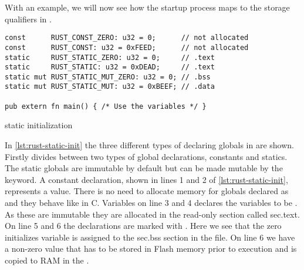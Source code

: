 With an example, we will now see how the startup process maps to the storage qualifiers in {\rust}.
\begin{listing}[H]
\begin{verbatim}
const      RUST_CONST_ZERO: u32 = 0;      // not allocated
const      RUST_CONST: u32 = 0xFEED;      // not allocated
static     RUST_STATIC_ZERO: u32 = 0;     // .text
static     RUST_STATIC: u32 = 0xDEAD;     // .text
static mut RUST_STATIC_MUT_ZERO: u32 = 0; // .bss
static mut RUST_STATIC_MUT: u32 = 0xBEEF; // .data

pub extern fn main() { /* Use the variables */ }
\end{verbatim}
\caption{\rust static initialization}
\label{lst:rust-static-init}
\end{listing}
In \autoref{lst:rust-static-init} the three different types of declaring globals in {\rust} are shown.
Firstly {\rust} divides between two types of global declarations, constants and statics.
The static globals are immutable by default but can be made mutable by the  keyword.
A constant declaration, shown in lines 1 and 2 of \autoref{lst:rust-static-init}, represents a value.
There is no need to allocate memory for globals declared as  and they behave like  in C. 
Variables on line 3 and 4 declares the variables to be .
As these are immutable they are allocated in the read-only section called {\elf}sec{.text}.
On line 5 and 6 the declarations are marked with .
Here we see that the zero initializes variable is assigned to the {\elf}sec{.bss} section in the {\elf} file.
On line 6 we have a non-zero value that has to be stored in Flash memory prior to execution and is copied to RAM in the .
